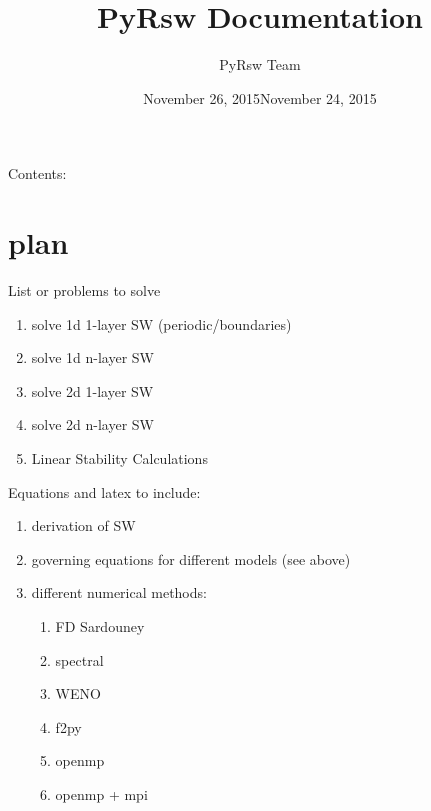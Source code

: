 \documentclass[letterpaper,10pt,english]{sphinxmanual}
\title{PyRsw Documentation}
\date{November 26, 2015}
\date{November 24, 2015}
\author{PyRsw Team}
\begin{document}
\maketitle
\tableofcontents
{}\label{index::doc}


Contents:


\chapter{plan}
\label{plan::doc}\label{plan:plan}\label{plan:welcome-to-pyrsw-s-documentation}
List or problems to solve
\begin{enumerate}
\item {} 
solve 1d 1-layer SW (periodic/boundaries)

\item {} 
solve 1d n-layer SW

\item {} 
solve 2d 1-layer SW

\item {} 
solve 2d n-layer SW

\item {} 
Linear Stability Calculations

\end{enumerate}

Equations and latex to include:
\begin{enumerate}
\item {} 
derivation of SW

\item {} 
governing equations for different models (see above)

\item {} 
different numerical methods:
\begin{enumerate}
\item {} 
FD Sardouney

\item {} 
spectral

\item {} 
WENO

\item {} 
f2py

\item {} 
openmp

\item {} 
openmp + mpi

\end{enumerate}

\end{enumerate}
\end{document}
